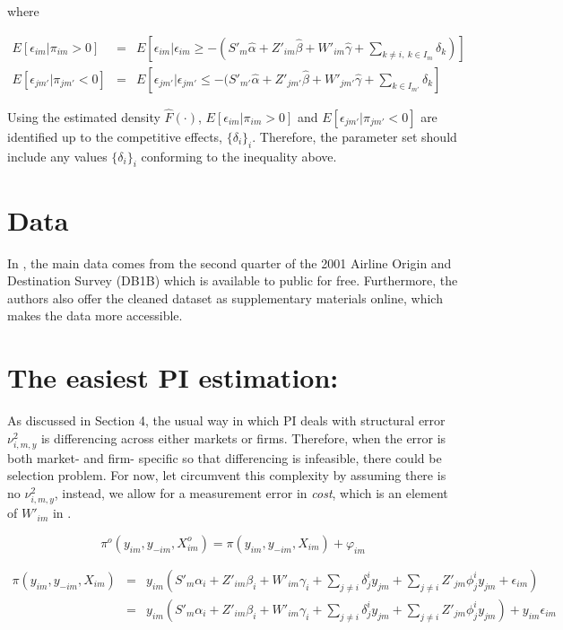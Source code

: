 \documentclass[a4paper]{article}
\begin{document}
where

$$
\begin{array}{rcl}
E[\epsilon_{im} | \pi_{im} > 0 ] & = & \displaystyle E[\epsilon_{im} | \epsilon_{im} \geq -  (S'_m\hat{\alpha}+Z'_{im}\hat{\beta}+W'_{im}\hat{\gamma}+\sum_{k\neq i,\ k \in I_m}\delta_{k})] \\
E[\epsilon_{jm'} | \pi_{jm'} < 0 ] & = & \displaystyle E[\epsilon_{jm'} | \epsilon_{jm'} \leq -  (S'_{m'}\hat{\alpha}+Z'_{jm'}\hat{\beta}+W'_{jm'}\hat{\gamma} + \sum_{k \in I_{m'}}\delta_{k}]
\end{array}
$$

Using the estimated density $\hat{F}(\cdot)$, $E[\epsilon_{im} | \pi_{im} > 0 ]$ and $E[\epsilon_{jm'} | \pi_{jm'} < 0 ]$ are identified up to the competitive effects, $\{\delta_i \}_i$. Therefore, the parameter set should include any values $\{\delta_i \}_i$ conforming to the inequality above. 


\section{Data}

In \cite{ciliberto2009market}, the main data comes from the second quarter of the 2001 Airline Origin and Destination Survey (DB1B) which is available to public for free. Furthermore, the authors also offer the cleaned dataset as supplementary materials online, which makes the data more accessible. 


\section{The easiest PI estimation:}

As discussed in Section 4, the usual way in which PI deals with structural error $\nu_{i,m,y}^2$ is differencing across either markets or firms. Therefore, when the error is both market- and firm- specific so that differencing is infeasible, there could be selection problem. For now, let circumvent this complexity by assuming there is no $\nu_{i,m,y}^2$, instead, we allow for a measurement error in \textit{cost}, which is an element of $W'_{im}$ in \cite{ciliberto2009market}.


\begin{equation}
\pi^o(y_{im},y_{-im},X^o_{im})=\pi(y_{im},y_{-im},X_{im}) + \varphi_{im}
\end{equation}


\begin{eqnarray}
\pi(y_{im},y_{-im},X_{im})&=&y_{im}(S'_m\alpha_i+Z'_{im}\beta_i+W'_{im}\gamma_i+\sum_{j\neq i}\delta_{j}^i y_{jm}+\sum_{j\neq i}Z'_{jm}\phi_j^iy_{jm}+\epsilon_{im})  \nonumber \\
&=& y_{im}(S'_m\alpha_i+Z'_{im}\beta_i+W'_{im}\gamma_i+\sum_{j\neq i}\delta_{j}^i y_{jm}+\sum_{j\neq i}Z'_{jm}\phi_j^iy_{jm})+y_{im}\epsilon_{im} 
\label{profit}
\end{eqnarray}
\end{document}
